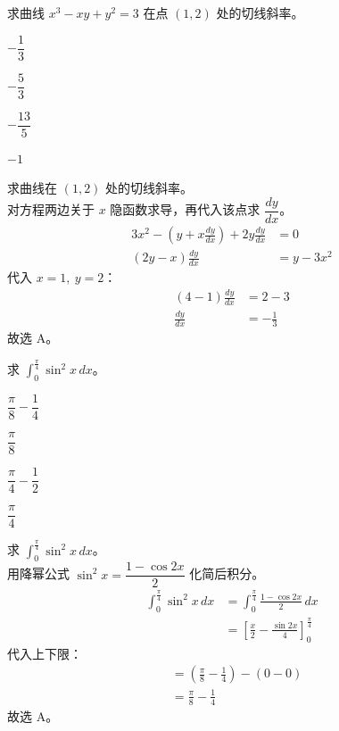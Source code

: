 \documentclass[12pt,a4paper]{exam-zh}
\begin{document}
\begin{question}
    求曲线 $x^{3}-xy+y^{2}=3$ 在点 $(1,2)$ 处的切线斜率。\paren[A]
    \begin{choices}
        \item $-\dfrac{1}{3}$
        \item $-\dfrac{5}{3}$
        \item $-\dfrac{13}{5}$
        \item $-1$
    \end{choices}
\end{question}

\begin{solution}
    求曲线在 $(1,2)$ 处的切线斜率。 \\
    对方程两边关于 $x$ 隐函数求导，再代入该点求 $\dfrac{dy}{dx}$。
    \begin{align*}
        3x^{2}-\left(y+x\frac{dy}{dx}\right)+2y\frac{dy}{dx} &= 0 \\
        (2y-x)\frac{dy}{dx} &= y-3x^{2}
    \end{align*}
    代入 $x=1,\ y=2$：
    \begin{align*}
        (4-1)\frac{dy}{dx} &= 2-3 \\
        \frac{dy}{dx} &= -\frac{1}{3}
    \end{align*}
    故选 A。
\end{solution}

\begin{question}
    求 $\displaystyle\int_{0}^{\frac{\pi}{4}}\sin^{2}x\,dx$。\paren[A]
    \begin{choices}
        \item $\dfrac{\pi}{8}-\dfrac{1}{4}$
        \item $\dfrac{\pi}{8}$
        \item $\dfrac{\pi}{4}-\dfrac{1}{2}$
        \item $\dfrac{\pi}{4}$
    \end{choices}
\end{question}

\begin{solution}
    求 $\displaystyle\int_{0}^{\frac{\pi}{4}}\sin^{2}x\,dx$。 \\
    用降幂公式 $\sin^{2}x=\dfrac{1-\cos2x}{2}$ 化简后积分。
    \begin{align*}
        \int_{0}^{\frac{\pi}{4}}\sin^{2}x\,dx &= \int_{0}^{\frac{\pi}{4}}\frac{1-\cos2x}{2}\,dx \\
        &= \left[\frac{x}{2}-\frac{\sin2x}{4}\right]_{0}^{\frac{\pi}{4}}
    \end{align*}
    代入上下限：
    \begin{align*}
        &= \left(\frac{\pi}{8}-\frac{1}{4}\right)-(0-0) \\
        &= \frac{\pi}{8}-\frac{1}{4}
    \end{align*}
    故选 A。
\end{solution}
\end{document}
